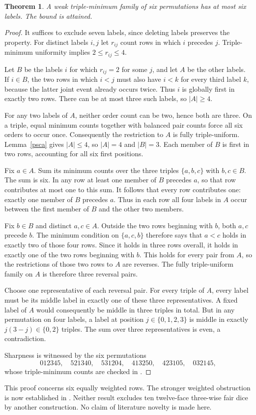 \documentclass[11pt]{article}
\newtheorem{theorem}{Theorem}
\begin{document}
\begin{theorem}
A weak triple-minimum family of six permutations has at most six
labels. The bound is attained.
\end{theorem}
\begin{proof}
It suffices to exclude seven labels, since deleting labels preserves
the property. For distinct labels $i,j$ let $r_{ij}$ count rows in
which $i$ precedes $j$. Triple-minimum uniformity implies
$2\le r_{ij}\le4$.

Let $B$ be the labels $i$ for which $r_{ij}=2$ for some $j$, and let
$A$ be the other labels. If $i\in B$, the two rows in which $i<j$
must also have $i<k$ for every third label $k$, because the latter
joint event already occurs twice. Thus $i$ is globally first in
exactly two rows. There can be at most three such labels, so
$|A|\ge4$.

For any two labels of $A$, neither order count can be two, hence both
are three. On a triple, equal minimum counts together with balanced
pair counts force all six orders to occur once. Consequently the
restriction to $A$ is fully triple-uniform. Lemma~\ref{psca} gives
$|A|\le4$, so $|A|=4$ and $|B|=3$. Each member of $B$ is first in
two rows, accounting for all six first positions.

Fix $a\in A$. Sum its minimum counts over the three triples
$\{a,b,c\}$ with $b,c\in B$. The sum is six. In any row at least
one member of $B$ precedes $a$, so that row contributes at most one
to this sum. It follows that every row contributes one: exactly one
member of $B$ precedes $a$. Thus in each row all four labels in $A$
occur between the first member of $B$ and the other two members.

Fix $b\in B$ and distinct $a,c\in A$. Outside the two rows beginning
with $b$, both $a,c$ precede $b$. The minimum condition on
$\{a,c,b\}$ therefore says that $a<c$ holds in exactly two of those
four rows. Since it holds in three rows overall, it holds in exactly
one of the two rows beginning with $b$. This holds for every pair
from $A$, so the restrictions of those two rows to $A$ are reverses.
The fully triple-uniform family on $A$ is therefore three reversal
pairs.

Choose one representative of each reversal pair. For every triple of
$A$, every label must be its middle label in exactly one of these
three representatives. A fixed label of $A$ would consequently be
middle in three triples in total. But in any permutation on four
labels, a label at position $j\in\{0,1,2,3\}$ is middle in exactly
$j(3-j)\in\{0,2\}$ triples. The sum over three representatives is
even, a contradiction.

Sharpness is witnessed by the six permutations
\[
 012345,\quad521340,\quad531204,\quad413250,\quad423105,\quad032145,
\]
whose triple-minimum counts are checked in
.
\end{proof}
This proof concerns six equally weighted rows. The stronger weighted
obstruction is now established in
. Neither result excludes
ten twelve-face three-wise fair dice by another construction.
No claim of literature novelty is made here.
\end{document}
